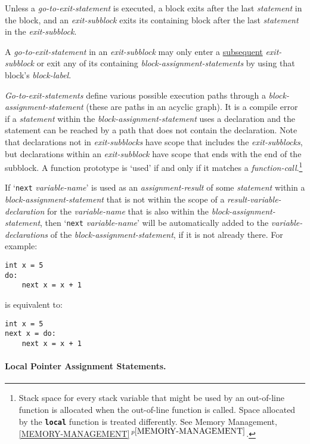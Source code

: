 \documentclass[12pt]{article}
\newcommand{\subsubsubsection}[1]{\paragraph[#1]{#1.}}
\newcommand{\TT}[1]{{\tt \bfseries #1}}
\newcommand{\itemref}[1]{\ref{#1}$\,^{p\pageref{#1}}$}
\newenvironment{indpar}[1][0.3in]%
	{\begin{list}{}%
		     {\setlength{\itemsep}{0in}%
		      \setlength{\topsep}{0in}%
		      \setlength{\parsep}{1ex}%
		      \setlength{\labelwidth}{#1}%
		      \setlength{\leftmargin}{#1}%
		      \addtolength{\leftmargin}{\labelsep}}%
	 \item}%
	{\end{list}}
\begin{document}
Unless a {\em go-to-exit-statement} is executed,
a block exits after the last {\em statement} in the block,
and an {\em exit-subblock} exits its containing block after the last
{\em statement} in the {\em exit-subblock}.

A {\em go-to-exit-statement} in an {\em exit-subblock} may only enter
a \underline{subsequent} {\em exit-subblock} or exit any of its containing
{\em block-assignment-statements} by using that block's {\em block-label}.

{\em Go-to-exit-statements} define various possible execution
paths through a {\em block-assignment-statement}
(these are paths in an acyclic graph).
It is a compile error if a {\em statement}
within the {\em block-assignment-statement}
uses a declaration and the statement can be reached by a path that
does not contain the declaration.
Note that declarations not in {\em exit-subblocks} have scope
that includes the {\em exit-subblocks}, but declarations
within an {\em exit-subblock} have scope that ends with the end of
the subblock.  A function prototype is `used' if and only if it
matches a {\em function-call}.\footnote{Stack space for every
stack variable that might be used by an out-of-line function is
allocated when the out-of-line function is called.  Space allocated
by the \TT{local} function is treated differently.  See
Memory Management, \itemref{MEMORY-MANAGEMENT}.}

If\label{BLOCK-NEXT-PROMOTION} `{\tt next} {\em variable-name}' is used as an
{\em assignment-result} of some {\em statement} within a
{\em block-assignment-statement} that is not within the scope of
a {\em result-variable-declaration} for the {\em variable-name}
that is also within the {\em block-assignment-statement},
then `{\tt next} {\em variable-name}' will be automatically added
to the {\em variable-declarations} of the {\em block-assignment-statement},
if it is not already there.  For example:
\begin{indpar}\begin{verbatim}
int x = 5
do:
    next x = x + 1
\end{verbatim}\end{indpar}
is equivalent to:
\begin{indpar}\begin{verbatim}
int x = 5
next x = do:
    next x = x + 1
\end{verbatim}\end{indpar}

\subsubsubsection{Local Pointer Assignment Statements}
\label{LOCAL-POINTER-ASSIGNMENT-STATEMENTS}
\end{document}
